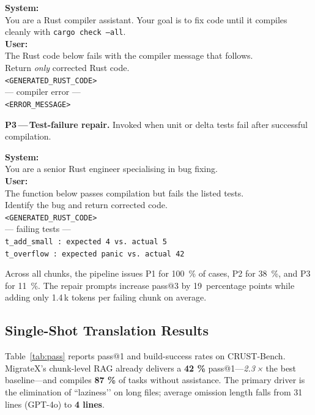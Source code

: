 \documentclass[twocolumn]{article}
\begin{document}
    \begin{tcolorbox}
    \small
    \textbf{System:}\\
    You are a Rust compiler assistant.  Your goal is to fix code until it
    compiles cleanly with \texttt{cargo check --all}.\\[2pt]
    \textbf{User:}\\
    The Rust code below fails with the compiler message that follows.\\
    Return \emph{only} corrected Rust code.\\[6pt]
    \texttt{\textless GENERATED\_RUST\_CODE\textgreater}\\[4pt]
    --- compiler error ---\\
    \texttt{\textless ERROR\_MESSAGE\textgreater}
    \end{tcolorbox}
    
    \noindent\textbf{P3\,---\,Test-failure repair.}
    Invoked when unit or delta tests fail after successful compilation.
    
    \begin{tcolorbox}
    \small
    \textbf{System:}\\
    You are a senior Rust engineer specialising in bug fixing.\\[2pt]
    \textbf{User:}\\
    The function below passes compilation but fails the listed tests.\\
    Identify the bug and return corrected code.\\[6pt]
    \texttt{\textless GENERATED\_RUST\_CODE\textgreater}\\[4pt]
    --- failing tests ---\\
    \texttt{t\_add\_small :  expected 4  vs.\  actual 5}\\
    \texttt{t\_overflow  :  expected panic vs.\ actual 42}
    \end{tcolorbox}
    
    \bigskip
    Across all chunks, the pipeline issues P1 for 100~\% of cases, P2 for
    38~\%, and P3 for 11~\%.  The repair prompts increase pass@3 by
    19~percentage points while adding only 1.4\,k tokens per
    failing chunk on average.
    
    \subsection{Single-Shot Translation Results}
    \label{subsec:single}
    Table~\ref{tab:pass} reports pass@1 and build-success rates on CRUST-Bench.  
    MigrateX’s chunk-level RAG already delivers a \textbf{42 \%} pass@1—\textit{2.3\,×} the best baseline—and compiles \textbf{87 \%} of tasks without assistance.  
    The primary driver is the elimination of “laziness’’ on long files; average omission length falls from 31 lines (GPT-4o) to \textbf{4 lines}.  
    
\end{document}
